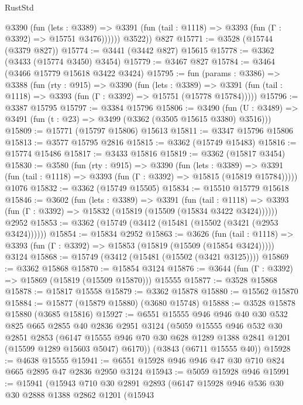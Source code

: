 \begin{lexlean}{RustStd}
\begin{coremodule}
            @3390
              (fun (lets : @3389) =>
              @3391 (fun (tail : @1118) => @3393 (fun (Γ : @3392) => @15751 @3476))))))
        @3522))
    @827
@15771 := @3528 (@15744 (@3379 @827))
@15774 := @3441 (@3442 @827) @15615
@15778 := @3362 (@3433 (@15774 @3450) @3454)
@15779 := @3467 @827
@15784 := @3464 (@3466 @15779 @15618 @3422 @3424)
@15795 := fun (params : @3386) =>
  @3388
    (fun (rty : @915) =>
    @3390
      (fun (lets : @3389) =>
      @3391 (fun (tail : @1118) => @3393 (fun (Γ : @3392) => @15751 (@15778 @15784)))))
@15796 := @3387 @15795
@15797 := @3384 @15796
@15806 := @3490
    (fun (U : @3489) => @3491 (fun (t : @23) => @3499 (@3362 (@3505 @15615 @3380) @3516)))
@15809 := @15771 (@15797 @15806) @15613
@15811 := @3347 @15796 @15806
@15813 := @3577 @15795 @2816
@15815 := @3362 (@15749 @15483)
@15816 := @15774 @15486
@15817 := @3433 @15816
@15819 := @3362 (@15817 @3454)
@15830 := @3580
    (fun (rty : @915) =>
    @3390
      (fun (lets : @3389) =>
      @3391 (fun (tail : @1118) => @3393 (fun (Γ : @3392) => @15815 (@15819 @15784)))))
    @1076
@15832 := @3362 (@15749 @15505)
@15834 := @15510 @15779 @15618
@15846 := @3602
    (fun (lets : @3389) =>
    @3391
      (fun (tail : @1118) =>
      @3393 (fun (Γ : @3392) => @15832 (@15819 (@15509 (@15834 @3422 @3424))))))
    @2952
@15853 := @3362 (@15749 (@3412 (@15481 (@15502 (@3421 (@2953 @3424))))))
@15854 := @15834 @2952
@15863 := @3626
    (fun (tail : @1118) => @3393 (fun (Γ : @3392) => @15853 (@15819 (@15509 (@15854 @3424)))))
    @3124
@15868 := @15749 (@3412 (@15481 (@15502 (@3421 @3125))))
@15869 := @3362 @15868
@15870 := @15854 @3124
@15876 := @3644 (fun (Γ : @3392) => @15869 (@15819 (@15509 @15870))) @15555
@15877 := @3528 @15868
@15878 := @15817 @15558
@15879 := @3362 @15878
@15880 := @15562 @15870
@15884 := @15877 (@15879 @15880) (@3680 @15748)
@15888 := @3528 @15878 @15880 (@3685 @15816)
@15927 := @6551
    @15555
    @946
    @946
    @40
    @30
    @532
    @825
    @665
    @2855
    @40
    @2836
    @2951
    @3124
    (@5059
      @15555
      @946
      @532
      @30
      @2851
      @2853
      (@6147 @15555 @946 @70 @30 @628 @1289 @1388 @2841 @1201 (@15599 @1289 @15603 @5047) @6170))
    (@3843 (@6711 @15555 @40))
@15928 := @4638 @15555
@15941 := @6551 @15928 @946 @946 @47 @30 @710 @824 @665 @2895 @47 @2836 @2950 @3124
@15943 := @5059 @15928 @946
@15991 := @15941
    (@15943
      @710
      @30
      @2891
      @2893
      (@6147
        @15928
        @946
        @536
        @30
        @30
        @2888
        @1388
        @2862
        @1201
        (@15943

\end{coremodule}
\end{lexlean}
